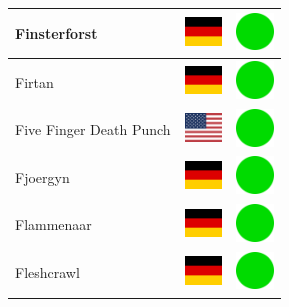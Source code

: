 \documentclass[12pt, a4paper, twoside]{report}
\begin{document}
\begin{center}
\begin{longtable}{|p{5cm}|p{2cm}|p{2cm}|}
 Finsterforst                                               & \includegraphics[width=1cm]{4x3/de} &   \includegraphics[width=1cm]{likes/y} \\ \hline
 Firtan                                                     & \includegraphics[width=1cm]{4x3/de} &   \includegraphics[width=1cm]{likes/y} \\ \hline
 Five Finger Death Punch                                    & \includegraphics[width=1cm]{4x3/us} &   \includegraphics[width=1cm]{likes/y} \\ \hline
 Fjoergyn                                                   & \includegraphics[width=1cm]{4x3/de} &   \includegraphics[width=1cm]{likes/y} \\ \hline
 Flammenaar                                                 & \includegraphics[width=1cm]{4x3/de} &   \includegraphics[width=1cm]{likes/y} \\ \hline
 Fleshcrawl                                                 & \includegraphics[width=1cm]{4x3/de} &   \includegraphics[width=1cm]{likes/y} \\ \hline

\end{longtable}
\end{center}
\end{document}
